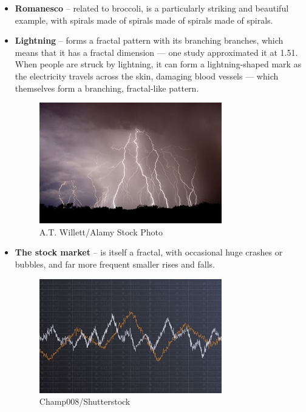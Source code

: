 \documentclass{article}
\begin{document}
\begin{itemize}
\item \textbf{Romanesco} -- related to broccoli, is a particularly striking and beautiful example, with spirals made of spirals made of spirals made of spirals.

\item \textbf{Lightning} -- forms a fractal pattern with its branching branches, which means that it has a fractal dimension — one study approximated it at 1.51. When people are struck by lightning, it can form a lightning-shaped mark as the electricity travels across the skin, damaging blood vessels — which themselves form a branching, fractal-like pattern.
\begin{figure}[H]
\centering
\includegraphics[scale=1.3]{DSC-B0818_09.jpg}
\caption{A.T. Willett/Alamy Stock Photo}
\end{figure}

\item \textbf{The stock market} --  is itself a fractal, with occasional huge crashes or bubbles, and far more frequent smaller rises and falls.
\begin{figure}[H]
\centering
\includegraphics[scale=1.3]{DSC-B0818_10.jpg}
\caption{Champ008/Shutterstock}
\end{figure}


\end{itemize}
\end{document}
